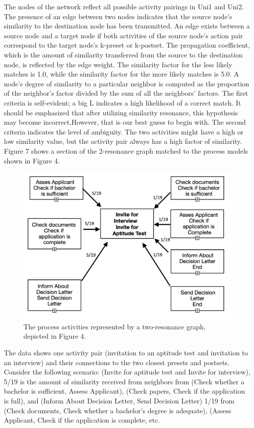 \documentclass[runningheads]{llncs}
\begin{document}
The nodes of the network reflect all possible activity pairings in Uni1 and Uni2. The presence of an edge between two nodes indicates that the source node's similarity to the destination node has been transmitted. An edge exists between a source node and a target node if both activities of the source node's action pair correspond to the target node's k-preset or k-postset. The propagation coefficient, which is the amount of similarity transferred from the source to the destination node, is reflected by the edge weight. The similarity factor for the less likely matches is 1.0, while the similarity factor for the more likely matches is 5.0. A node's degree of similarity to a particular neighbor is computed as the proportion of the neighbor's factor divided by the sum of all the neighbors' factors. The first criteria is self-evident; a big L indicates a high likelihood of a correct match. It should be emphasized that after utilizing similarity resonance, this hypothesis may become incorrect,However, that is our best guess to begin with. The second criteria indicates the level of ambiguity. The two activities might have a high or low similarity value, but the activity pair always has a high factor of similarity. Figure 7 shows a section of the 2-resonance graph matched to the process models shown in Figure 4.\cite{ref3}
\begin{figure}
    \centering
    \includegraphics[width = \textwidth]{Figures/Fig_7.PNG}
    \caption{The process activities represented by a two-resonance graph, depicted in Figure 4.}
    \label{fig:7}
\end{figure}

The data shows one activity pair (invitation to an aptitude test and invitation to an interview) and their connections to the two closest presets and postsets. Consider the following scenario: (Invite for aptitude test and Invite for interview), 5/19 is the amount of similarity received from neighbors from (Check whether a bachelor is sufficient, Assess Applicant), (Check papers, Check if the application is full), and (Inform About Decision Letter, Send Decision Letter) 1/19 from (Check documents, Check whether a bachelor's degree is adequate), (Assess Applicant, Check if the application is complete, etc.
\end{document}
